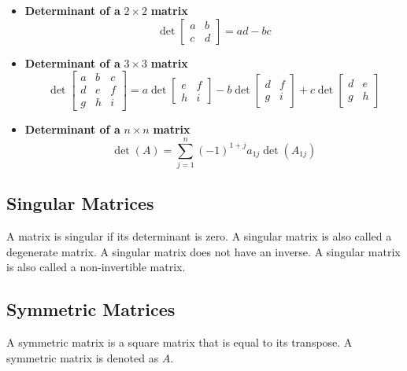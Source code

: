 \documentclass[titlepage,a4paper]{article}
\begin{document}
\begin{itemize}
				\item \textbf{Determinant of a} $2\times2$ \textbf{matrix}
					\begin{equation}
						\det
						\left[
							\begin{matrix}
								a & b \\
								c & d
							\end{matrix}
						\right]
						=ad-bc
					\end{equation}
				\item \textbf{Determinant of a} $3\times3$ \textbf{matrix}
					\begin{equation}
						\det
						\left[
							\begin{matrix}
								a & b & c \\
								d & e & f \\
								g & h & i
							\end{matrix}
						\right]
						=a\det
						\left[
							\begin{matrix}
								e & f \\
								h & i
							\end{matrix}
						\right]
						-b\det
						\left[
							\begin{matrix}
								d & f \\
								g & i
							\end{matrix}
						\right]
						+c\det
						\left[
							\begin{matrix}
								d & e \\
								g & h
							\end{matrix}
						\right]
					\end{equation}
				\item \textbf{Determinant of a} $n\times n$ \textbf{matrix}
					\begin{equation}
						\det(A)=\sum_{j=1}^n(-1)^{1+j}a_{1j}\det(A_{1j})
					\end{equation}
			\end{itemize}
			\newpage
	\subsection{Singular Matrices}
		A matrix is singular if its determinant is zero. A singular matrix is also called a degenerate matrix. A singular matrix does not have an inverse. A singular matrix is also called a non-invertible matrix.
	
	\subsection{Symmetric Matrices}
		A symmetric matrix is a square matrix that is equal to its transpose. A symmetric matrix is denoted as $A$.
\end{document}
